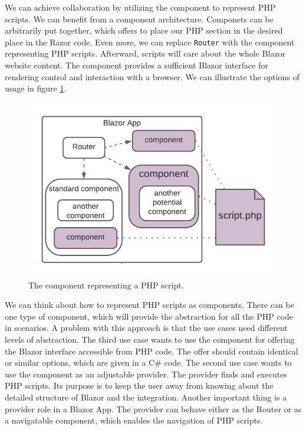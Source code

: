 We can achieve collaboration by utilizing the component to represent PHP scripts.
We can benefit from a component architecture.
Componets can be arbitrarily put together, which offers to place our PHP section in the desired place in the Razor code.
Even more, we can replace \texttt{Router} with the component representing PHP scripts.
Afterward, scripts will care about the whole Blazor website content.
The component provides a sufficient Blazor interface for rendering control and interaction with a browser. 
We can illustrate the options of usage in figure \ref{img12:component}.
\par
\begin{figure}[t]\centering
\includegraphics{./img/component}
\caption{The component representing a PHP script.}
\label{img12:component}
\end{figure} 
\par
We can think about how to represent PHP scripts as components.
There can be one type of component, which will provide the abstraction for all the PHP code in scenarios.
A problem with this approach is that the use cases need different levels of abstraction.
The third use case wants to use the component for offering the Blazor interface accessible from PHP code.
The offer should contain identical or similar options, which are given in a C\# code.
The second use case wants to use the component as an adjustable provider.
The provider finds and executes PHP scripts.
Its purpose is to keep the user away from knowing about the detailed structure of Blazor and the integration.
Another important thing is a provider role in a Blazor App.
The provider can behave either as the Router or as a navigatable component, which enables the navigation of PHP scripts.
